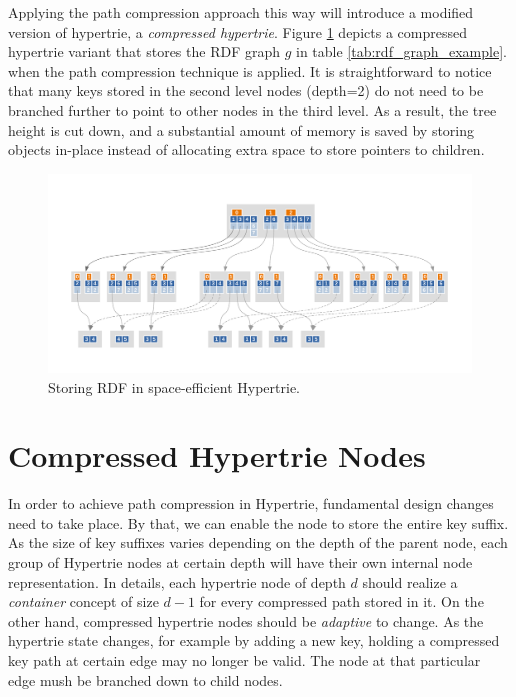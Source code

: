 Applying the path compression approach this way will introduce a modified version of hypertrie, a \textit{compressed hypertrie}.
Figure \ref{fig:rdf_compressed_hypertrie} depicts a compressed hypertrie variant that stores the RDF graph $g$ in table \ref{tab:rdf_graph_example}.
when the path compression technique is applied. It is straightforward to notice that many keys stored in the second level nodes (depth=2) do not need to be branched further to point to other nodes in the third level. 
As a result, the tree height is cut down, and a substantial amount of memory is saved by storing objects in-place instead of allocating extra space to store pointers to children. 

\begin{figure}
	\centering
	\includegraphics[scale=0.74]{figures/chapter4/compressedBHT}
	\caption{Storing RDF in space-efficient Hypertrie.}
	\label{fig:rdf_compressed_hypertrie}
\end{figure}


\section{Compressed Hypertrie Nodes}
\label{sec:compressed_nodes_representation}
In order to achieve path compression in Hypertrie, fundamental design changes need to take place. By that, we can enable the node to store the entire key suffix.
As the size of key suffixes varies depending on the depth of the parent node, each group of Hypertrie nodes at certain depth will have their own internal node representation. In details, each hypertrie node of depth $d$ should realize a \textit{container} concept of size $d-1$ for every compressed path stored in it. On the other hand, compressed hypertrie nodes should be \textit{adaptive} to change. As the hypertrie state changes, for example by adding a new key, holding a compressed key path at certain edge may no longer be valid. The node at that particular edge mush be branched down to child nodes. \\


